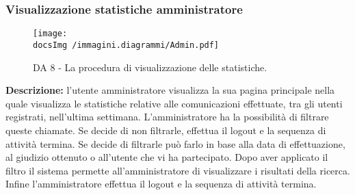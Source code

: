 		
		\subsubsection{Visualizzazione statistiche amministratore}
		\begin{center}
			\begin{figure}[htbp]
				\centering
				\texttt{[image: \\docsImg /immagini.diagrammi/Admin.pdf]}
			\caption{DA 8 - La procedura di visualizzazione delle statistiche.}	
			\end{figure}
		\end{center}
		\noindent \textbf{Descrizione: }
		l'utente amministratore visualizza la sua pagina principale nella quale visualizza le statistiche relative alle comunicazioni effettuate, tra gli utenti registrati, nell'ultima settimana.
		L'amministratore ha la possibilità di filtrare queste chiamate. Se decide di non filtrarle, effettua il logout e la sequenza di attività termina.
		Se decide di filtrarle può farlo in base alla data di effettuazione, al giudizio ottenuto o all'utente che vi ha partecipato. Dopo aver applicato il filtro il sistema permette all'amministratore di visualizzare i risultati della ricerca. Infine l'amministratore effettua il logout e la sequenza di attività termina.

\newpage